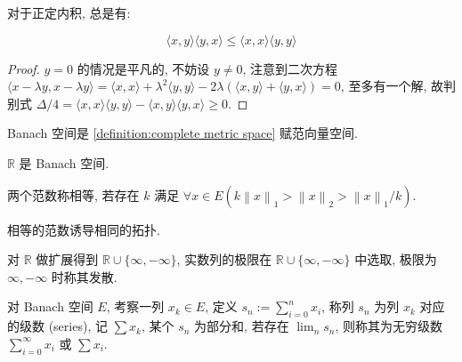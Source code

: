 \begin{theorem}
    对于正定内积, 总是有:

    \[
        \langle x,y \rangle \langle y,x \rangle \leq \langle x,x \rangle \langle y,y \rangle
    \]

    \begin{proof}
        \(y = 0\) 的情况是平凡的, 不妨设 \(y \neq 0\),
        注意到二次方程 \(\langle x - \lambda y,x - \lambda y \rangle = \langle x,x \rangle + \lambda^2 \langle y,y \rangle - 2 \lambda (\langle x,y \rangle + \langle y,x \rangle) = 0\),
        至多有一个解, 故判别式 \(\Delta/4 =  \langle x,x \rangle \langle y,y \rangle - \langle x,y \rangle \langle y,x \rangle \geq 0\).
    \end{proof}
\end{theorem}

\begin{definition}[Banach 空间]
    \label {definition:Banach space}
    Banach 空间是 \ref{definition:complete metric space} 赋范向量空间.
\end{definition}

\begin{example}
    \(\mathbb{R}\) 是 Banach 空间.
\end{example}

\begin{definition}[Lipschitz]
    两个范数称相等, 若存在 \(k\) 满足 \(\forall x \in E (k \left\|x\right\|_1 > \left\|x\right\|_2 > \left\|x\right\|_1/k)\).
\end{definition}

\begin{corollary}
    相等的范数诱导相同的拓扑.
\end{corollary}

\begin{definition}[实数极限]
    对 \(\mathbb{R}\) 做扩展得到 \(\mathbb{R} \cup \{\infty,-\infty\}\),
    实数列的极限在 \(\mathbb{R} \cup \{\infty,-\infty\}\) 中选取, 极限为 \(\infty,-\infty\) 时称其发散.
\end{definition}

\begin{definition}[级数]
    对 Banach 空间 \(E\), 考察一列 \(x_k \in E\), 定义 \(s_n := \sum_{i=0}^{n} x_i\), 称列 \(s_n\) 为列 \(x_k\) 对应的级数 (series), 记 \(\sum x_k\),
    某个 \(s_n\) 为部分和, 若存在 \(\lim_n s_n\), 则称其为无穷级数 \(\sum_{i=0}^{\infty} x_i\) 或 \(\sum x_i\).
\end{definition}


